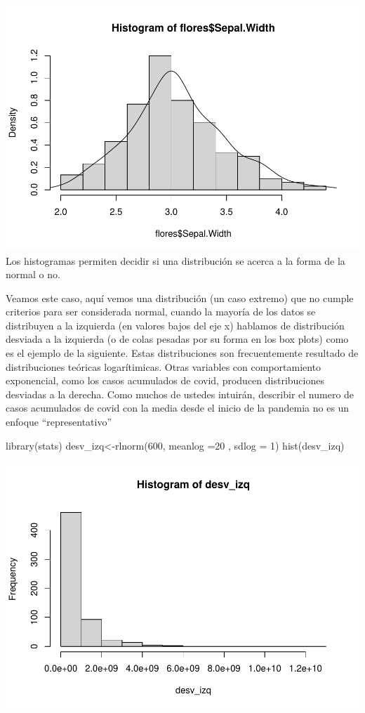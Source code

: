 \documentclass[
]{book}
\newenvironment{Shaded}{\begin{snugshade}}{\end{snugshade}}
\newcommand{\AttributeTok}[1]{\textcolor[rgb]{0.77,0.63,0.00}{#1}}
\newcommand{\DecValTok}[1]{\textcolor[rgb]{0.00,0.00,0.81}{#1}}
\newcommand{\FunctionTok}[1]{\textcolor[rgb]{0.00,0.00,0.00}{#1}}
\newcommand{\NormalTok}[1]{#1}
\newcommand{\OtherTok}[1]{\textcolor[rgb]{0.56,0.35,0.01}{#1}}
\begin{document}
\includegraphics{Esatadistica_en_R_files/figure-latex/unnamed-chunk-123-1.pdf}
Los histogramas permiten decidir si una distribución se acerca a la forma de la normal o no.

Veamos este caso, aquí vemos una distribución (un caso extremo) que no cumple criterios para ser considerada normal, cuando la mayoría de los datos se distribuyen a la izquierda (en valores bajos del eje x) hablamos de distribución desviada a la izquierda (o de colas pesadas por su forma en los box plots) como es el ejemplo de la siguiente. Estas distribuciones son frecuentemente resultado de distribuciones teóricas logarítimicas. Otras variables con comportamiento exponencial, como los casos acumulados de covid, producen distribuciones desviadas a la derecha. Como muchos de ustedes intuirán, describir el numero de casos acumulados de covid con la media desde el inicio de la pandemia no es un enfoque ``representativo''

\begin{Shaded}
\begin{Highlighting}[]
\FunctionTok{library}\NormalTok{(stats)}
\NormalTok{desv\_izq}\OtherTok{\textless{}{-}}\FunctionTok{rlnorm}\NormalTok{(}\DecValTok{600}\NormalTok{, }\AttributeTok{meanlog =}\DecValTok{20}\NormalTok{ , }\AttributeTok{sdlog =} \DecValTok{1}\NormalTok{)}
\FunctionTok{hist}\NormalTok{(desv\_izq)}
\end{Highlighting}
\end{Shaded}

\includegraphics{Esatadistica_en_R_files/figure-latex/unnamed-chunk-124-1.pdf}
\end{document}
